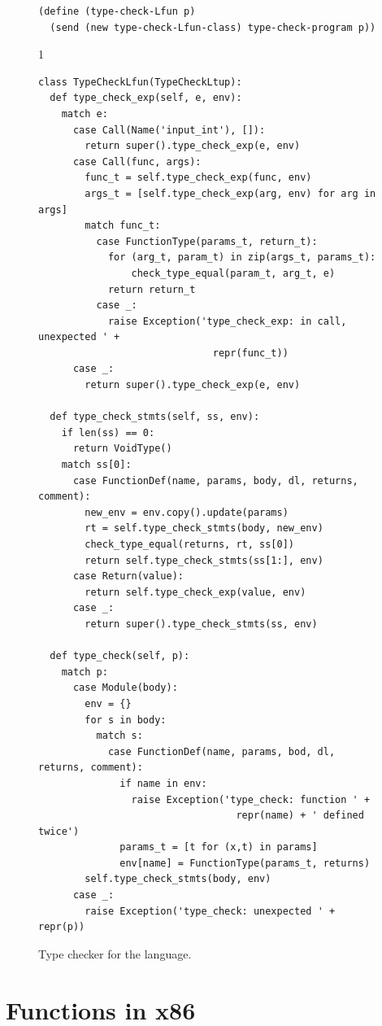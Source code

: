 \documentclass[7x10]{TimesAPriori_MIT}%
\def\pythonEd{1}
\def\edition{1}
\newcommand{\pythonColor}[0]{}
\numberwithin{theorem}{chapter}
\numberwithin{definition}{chapter}
\numberwithin{equation}{chapter}
\begin{document}
\begin{figure}[tp]
\begin{tcolorbox}[colback=white]
{\begin{lstlisting}[basicstyle=\ttfamily\footnotesize]
(define (type-check-Lfun p)
  (send (new type-check-Lfun-class) type-check-program p))
\end{lstlisting}
\fi}
{\if\edition\pythonEd\pythonColor
\begin{lstlisting}  
class TypeCheckLfun(TypeCheckLtup):
  def type_check_exp(self, e, env):
    match e:
      case Call(Name('input_int'), []):
        return super().type_check_exp(e, env)      
      case Call(func, args):
        func_t = self.type_check_exp(func, env)
        args_t = [self.type_check_exp(arg, env) for arg in args]
        match func_t:
          case FunctionType(params_t, return_t):
            for (arg_t, param_t) in zip(args_t, params_t):
                check_type_equal(param_t, arg_t, e)
            return return_t
          case _:
            raise Exception('type_check_exp: in call, unexpected ' +
                              repr(func_t))
      case _:
        return super().type_check_exp(e, env)

  def type_check_stmts(self, ss, env):
    if len(ss) == 0:
      return VoidType()
    match ss[0]:
      case FunctionDef(name, params, body, dl, returns, comment):
        new_env = env.copy().update(params)
        rt = self.type_check_stmts(body, new_env)
        check_type_equal(returns, rt, ss[0])
        return self.type_check_stmts(ss[1:], env)
      case Return(value):
        return self.type_check_exp(value, env)
      case _:
        return super().type_check_stmts(ss, env)

  def type_check(self, p):
    match p:
      case Module(body):
        env = {}
        for s in body:
          match s:
            case FunctionDef(name, params, bod, dl, returns, comment):
              if name in env:
                raise Exception('type_check: function ' +
                                  repr(name) + ' defined twice')
              params_t = [t for (x,t) in params]
              env[name] = FunctionType(params_t, returns)
        self.type_check_stmts(body, env)
      case _:
        raise Exception('type_check: unexpected ' + repr(p))
\end{lstlisting}
\fi}
  \end{tcolorbox}

  \caption{Type checker for the \LangFun{} language.}
\label{fig:type-check-Lfun}
\end{figure}


\clearpage

\section{Functions in x86}
\label{sec:fun-x86}
\end{document}
